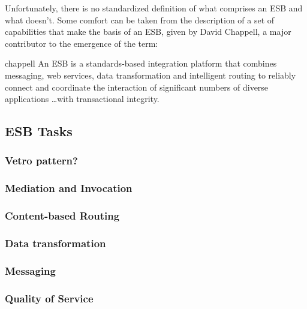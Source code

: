 
\newpage
Unfortunately, there is no standardized definition of what comprises an ESB and
what doesn't\supercite{wiki-de}. Some comfort can be taken from the description of a
set of capabilities that make the basis of an ESB, given by David Chappell, a
major contributor to the emergence of the term: 

\begin{mycite}{chappell}
An ESB is a standards-based integration platform that
combines messaging, web services, data transformation and intelligent routing to
reliably connect and coordinate the interaction of significant numbers of
diverse applications \ldots with transactional integrity.
\end{mycite}

\subsection{ESB Tasks}
\label{sec:esb-tasks}

\subsubsection{Vetro pattern?}



\subsubsection{Mediation and Invocation}
\label{subsec:mediation-and-invocation}

\subsubsection{Content-based Routing}
\label{subsec:content-based-routing}

\subsubsection{Data transformation}
\label{subsec:data-transformation}

\subsubsection{Messaging}
\label{subsec:messaging}

\subsubsection{Quality of Service}
\label{subsec:quality-of-service}

